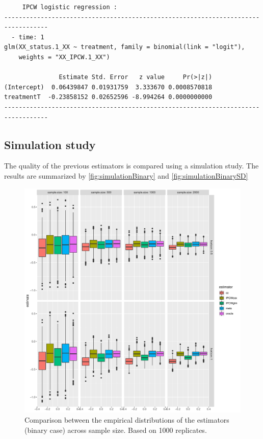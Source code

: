\documentclass[12pt]{article}
\begin{document}
\begin{verbatim}
     IPCW logistic regression : 
----------------------------------------------------------------------------------
  - time: 1
glm(XX_status.1_XX ~ treatment, family = binomial(link = "logit"), 
    weights = "XX_IPCW.1_XX")

               Estimate Std. Error   z value     Pr(>|z|)
(Intercept)  0.06439847 0.01931759  3.333670 0.0008570818
treatmentT  -0.23858152 0.02652596 -8.994264 0.0000000000
----------------------------------------------------------------------------------
\end{verbatim}

\subsection{Simulation study}
\label{sec:orgf3f4729}

The quality of the previous estimators is compared using a simulation
study. The results are summarized by \autoref{fig:simulationBinary} and \autoref{fig:simulationBinarySD} 
\begin{figure}[!h]
\centering
\includegraphics[width=\textwidth]{./figures/simStudy-bin-bias.pdf}
\caption{\label{fig:simulationBinary}Comparison between the empirical distributions of the estimators (binary case) across sample size. Based on 1000 replicates.}
\end{figure}
\end{document}
